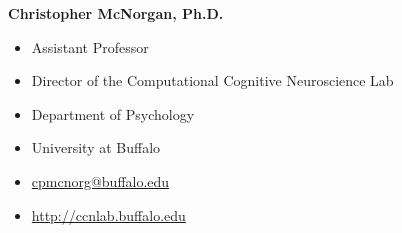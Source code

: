 \documentclass[11pt]{article}
\begin{document}
\vspace{0.2cm}

\textbf{Christopher McNorgan, Ph.D.}

\begin{itemize}[leftmargin=!,labelindent=!]
    \item[] Assistant Professor
    \item[] Director of the Computational Cognitive Neuroscience Lab
    \item[] Department of Psychology
    \item[] University at Buffalo
    \item[] \href{mailto:cpmcnorg@buffalo.edu}{cpmcnorg@buffalo.edu}
    \item[] \url{http://ccnlab.buffalo.edu}
\end{itemize}
\end{document}
